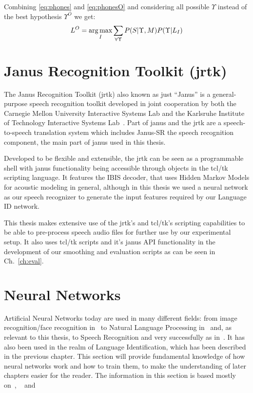 Combining \ref{eq:phones} and \ref{eq:phonesO} and considering all possible \(\Upsilon\) instead of the best hypothesis \(\Upsilon^O\) we get:
\begin{equation}
L^O = \operatorname*{arg\,max}_{I}\sum_{\forall \Upsilon}P(S|\Upsilon, M)P(\Upsilon|L_I)
\end{equation}

\section{Janus Recognition Toolkit (jrtk)}
\label{sec:fund:jrtk}
The Janus Recognition Toolkit (jrtk) also known as just ``Janus'' is a general-purpose speech recognition toolkit developed in joint cooperation by both the Carnegie Mellon University Interactive Systems Lab and the Karlsruhe Institute of Technology Interactive Systems Lab~\cite{lavie1997janus}. Part of janus and the jrtk are a speech-to-speech translation system which includes Janus-SR the speech recognition component, the main part of janus used in this thesis. 

Developed to be flexible and extensible, the jrtk can be seen as a programmable shell with janus functionality being accessible through objects in the tcl/tk scripting language. It features the IBIS decoder, that uses Hidden Markov Models for acoustic modeling in general, although in this thesis we used a neural network as our speech recognizer to generate the input features required by our Language ID network.

This thesis makes extensive use of the jrtk's and tcl/tk's scripting capabilities to be able to pre-process speech audio files for further use by our experimental setup. It also uses tcl/tk scripts and it's janus API functionality in the development of our smoothing and evaluation scripts as can be seen in Ch.~\ref{ch:eval}.
\section{Neural Networks}
\label{sec:fund:NN}
Artificial Neural Networks today are used in many different fields: from image recognition/face recognition in~\cite{lawrence1997face} to Natural Language Processing in~\cite{collobert2008unified} and, as relevant to this thesis, to Speech Recognition and very successfully as in~\cite{hinton2012deep}. It has also been used in the realm of Language Identification, which has been described in the previous chapter. This section will provide fundamental knowledge of how neural networks work and how to train them, to make the understanding of later chapters easier for the reader. The information in this section is based mostly on~\cite{haykin2004comprehensive}, ~\cite{Goodfellow-et-al-2016} and~\cite{deeplearning-online}


